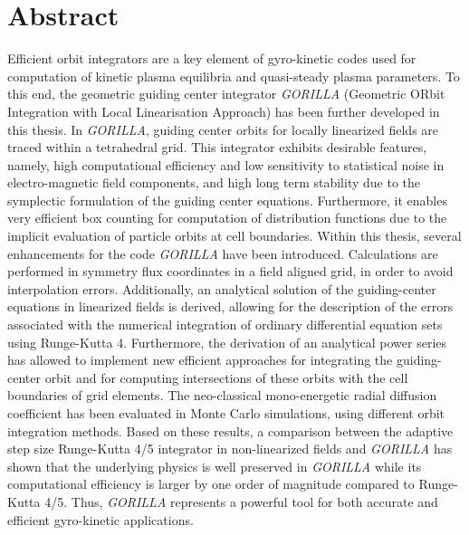 \documentclass[./main.tex]{subfiles}
\begin{document}
\chapter*{Abstract}
\label{cha:abstract}
Efficient orbit integrators are a key element of gyro-kinetic codes used for computation of kinetic plasma equilibria and quasi-steady plasma parameters. To this end, the geometric guiding center integrator \textit{GORILLA}  (Geometric ORbit Integration with Local Linearisation Approach) has been further developed in this thesis. In \textit{GORILLA}, guiding center orbits for locally linearized fields are traced within a tetrahedral grid. This integrator exhibits desirable features, namely, high computational efficiency and low sensitivity to statistical noise in electro-magnetic field components, and high long term stability due to the symplectic formulation of the guiding center equations. Furthermore, it enables very efficient box counting for computation of distribution functions due to the implicit evaluation of particle orbits at cell boundaries.
Within this thesis, several enhancements for the code \textit{GORILLA} have been introduced.
Calculations are performed in symmetry flux coordinates in a field aligned grid, in order to avoid interpolation errors. Additionally, an analytical solution of the guiding-center equations in linearized fields is derived, allowing for the description of the errors associated with the numerical integration of ordinary differential equation sets using Runge-Kutta 4.  
Furthermore, the derivation of an analytical power series has allowed to implement new efficient approaches for integrating the guiding-center orbit and for computing intersections of these orbits with the cell boundaries of grid elements. The neo-classical mono-energetic radial diffusion coefficient has been evaluated in Monte Carlo simulations, using different orbit integration methods. Based on these results, a comparison between the adaptive step size Runge-Kutta 4/5 integrator in non-linearized fields and \textit{GORILLA} has shown that the underlying physics is well preserved in \textit{GORILLA} while its computational efficiency is larger by one order of magnitude compared to Runge-Kutta 4/5. Thus, \textit{GORILLA} represents a powerful tool for both accurate and efficient gyro-kinetic applications.
\end{document}
